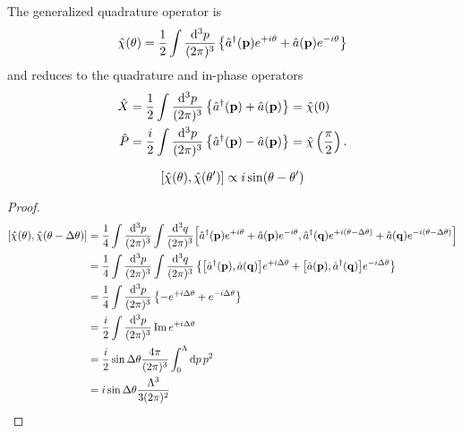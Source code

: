 \begin{definition}
	The generalized quadrature operator is
	\begin{equation}
		\hat\chi(\theta)
		=
		\frac{1}{2}
		\int\frac{\dd[3]{p}}{(2\pi)^3}
		\left\{
			\hat{a}^\dagger(\vb{p})
			e^{+i\theta}
			+
			\hat{a}(\vb{p})
			e^{-i\theta}
		\right\}
	\end{equation}
	and reduces to the quadrature and in-phase operators
	\begin{align}
		\hat{X}
		&=
		\frac{1}{2}
		\int\frac{\dd[3]{p}}{(2\pi)^3}
		\left\{
			\hat{a}^\dagger(\vb{p})
			+
			\hat{a}(\vb{p})
		\right\}
		=
		\hat\chi(0)
		\\
		\hat{P}
		&=
		\frac{i}{2}
		\int\frac{\dd[3]{p}}{(2\pi)^3}
		\left\{
			\hat{a}^\dagger(\vb{p})
			-
			\hat{a}(\vb{p})
		\right\}
		=
		\hat\chi\left(\frac{\pi}{2}\right)
		.
	\end{align}
\end{definition}
\begin{lemma}
	\begin{equation}
		\comm{\hat\chi(\theta)}{\hat\chi(\theta^\prime)}
		\propto
		i\sin(\theta-\theta^\prime)
	\end{equation}
\end{lemma}
\begin{proof}
	\begin{equation*}
		\begin{split}
			\comm{\hat\chi(\theta)}{\hat\chi(\theta-\Delta\theta)}
			&=
			\frac{1}{4}
			\int\frac{\dd[3]{p}}{(2\pi)^3}
			\int\frac{\dd[3]{q}}{(2\pi)^3}
			\comm{
				\hat{a}^\dagger(\vb{p})
				e^{+i\theta}
				+
				\hat{a}(\vb{p})
				e^{-i\theta}
			}{
				\hat{a}^\dagger(\vb{q})
				e^{+i(\theta-\Delta\theta)}
				+
				\hat{a}(\vb{q})
				e^{-i(\theta-\Delta\theta)}
			}
			\\
			&=
			\frac{1}{4}
			\int\frac{\dd[3]{p}}{(2\pi)^3}
			\int\frac{\dd[3]{q}}{(2\pi)^3}
			\left\{
				\comm{\hat{a}^\dagger(\vb{p})}{\hat{a}(\vb{q})}
				e^{+i\Delta\theta}
				+
				\comm{\hat{a}(\vb{p})}{\hat{a}^\dagger(\vb{q})}
				e^{-i\Delta\theta}
			\right\}
			\\
			&=
			\frac{1}{4}
			\int\frac{\dd[3]{p}}{(2\pi)^3}
			\left\{
				-
				e^{+i\Delta\theta}
				+
				e^{-i\Delta\theta}
			\right\}
			\\
			&=
			\frac{i}{2}
			\int\frac{\dd[3]{p}}{(2\pi)^3}
			\Im e^{+i\Delta\theta}
			\\
			&=
			\frac{i}{2}
			\sin\Delta\theta
			\frac{4\pi}{(2\pi)^3}
			\int_0^\Lambda \dd{p}p^2
			\\
			&=
			i
			\sin\Delta\theta
			\frac{\Lambda^3}{3(2\pi)^2}
		\end{split}
	\end{equation*}
\end{proof}

